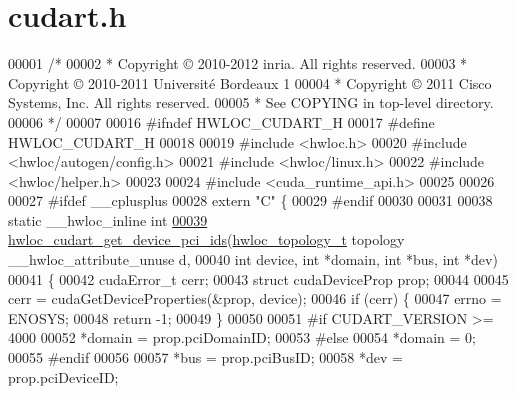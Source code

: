 \hypertarget{a00029_source}{
\section{cudart.h}
}

\begin{DoxyCode}
00001 \textcolor{comment}{/*}
00002 \textcolor{comment}{ * Copyright © 2010-2012 inria.  All rights reserved.}
00003 \textcolor{comment}{ * Copyright © 2010-2011 Université Bordeaux 1}
00004 \textcolor{comment}{ * Copyright © 2011 Cisco Systems, Inc.  All rights reserved.}
00005 \textcolor{comment}{ * See COPYING in top-level directory.}
00006 \textcolor{comment}{ */}
00007 
00016 \textcolor{preprocessor}{#ifndef HWLOC\_CUDART\_H}
00017 \textcolor{preprocessor}{}\textcolor{preprocessor}{#define HWLOC\_CUDART\_H}
00018 \textcolor{preprocessor}{}
00019 \textcolor{preprocessor}{#include <hwloc.h>}
00020 \textcolor{preprocessor}{#include <hwloc/autogen/config.h>}
00021 \textcolor{preprocessor}{#include <hwloc/linux.h>}
00022 \textcolor{preprocessor}{#include <hwloc/helper.h>}
00023 
00024 \textcolor{preprocessor}{#include <cuda\_runtime\_api.h>}
00025 
00026 
00027 \textcolor{preprocessor}{#ifdef \_\_cplusplus}
00028 \textcolor{preprocessor}{}\textcolor{keyword}{extern} \textcolor{stringliteral}{"C"} \{
00029 \textcolor{preprocessor}{#endif}
00030 \textcolor{preprocessor}{}
00031 
00038 \textcolor{keyword}{static} \_\_hwloc\_inline \textcolor{keywordtype}{int}
\hypertarget{a00029_source_l00039}{}\hyperlink{a00071_ga1cbf127459986c345f873e2752ddf681}{00039} \hyperlink{a00071_ga1cbf127459986c345f873e2752ddf681}{hwloc_cudart_get_device_pci_ids}(\hyperlink{a00039_ga9d1e76ee15a7dee158b786c30b6a6e38}{hwloc_topology_t} topology \_\_hwloc\_attribute\_unuse
      d,
00040                                \textcolor{keywordtype}{int} device, \textcolor{keywordtype}{int} *domain, \textcolor{keywordtype}{int} *bus, \textcolor{keywordtype}{int} *dev)
00041 \{
00042   cudaError\_t cerr;
00043   \textcolor{keyword}{struct }cudaDeviceProp prop;
00044 
00045   cerr = cudaGetDeviceProperties(&prop, device);
00046   \textcolor{keywordflow}{if} (cerr) \{
00047     errno = ENOSYS;
00048     \textcolor{keywordflow}{return} -1;
00049   \}
00050 
00051 \textcolor{preprocessor}{#if CUDART\_VERSION >= 4000}
00052 \textcolor{preprocessor}{}  *domain = prop.pciDomainID;
00053 \textcolor{preprocessor}{#else}
00054 \textcolor{preprocessor}{}  *domain = 0;
00055 \textcolor{preprocessor}{#endif}
00056 \textcolor{preprocessor}{}
00057   *bus = prop.pciBusID;
00058   *dev = prop.pciDeviceID;

\end{DoxyCode}
